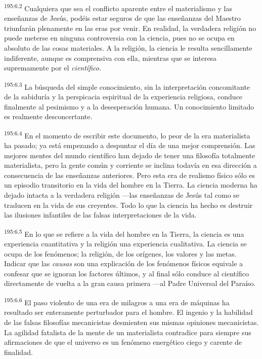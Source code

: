 \par 
\textsuperscript{195:6.2} Cualquiera que sea el conflicto aparente entre el materialismo y las enseñanzas de Jesús, podéis estar seguros de que las enseñanzas del Maestro triunfarán plenamente en las eras por venir. En realidad, la verdadera religión no puede meterse en ninguna controversia con la ciencia, pues no se ocupa en absoluto de las cosas materiales. A la religión, la ciencia le resulta sencillamente indiferente, aunque es comprensiva con ella, mientras que se interesa supremamente por el \textit{científico}.

\par 
\textsuperscript{195:6.3} La búsqueda del simple conocimiento, sin la interpretación concomitante de la sabiduría y la perspicacia espiritual de la experiencia religiosa, conduce finalmente al pesimismo y a la desesperación humana. Un conocimiento limitado es realmente desconcertante.

\par 
\textsuperscript{195:6.4} En el momento de escribir este documento, lo peor de la era materialista ha pasado; ya está empezando a despuntar el día de una mejor comprensión. Las mejores mentes del mundo científico han dejado de tener una filosofía totalmente materialista, pero la gente común y corriente se inclina todavía en esa dirección a consecuencia de las enseñanzas anteriores. Pero esta era de realismo físico sólo es un episodio transitorio en la vida del hombre en la Tierra. La ciencia moderna ha dejado intacta a la verdadera religión ---las enseñanzas de Jesús tal como se traducen en la vida de sus creyentes. Todo lo que la ciencia ha hecho es destruir las ilusiones infantiles de las falsas interpretaciones de la vida.

\par 
\textsuperscript{195:6.5} En lo que se refiere a la vida del hombre en la Tierra, la ciencia es una experiencia cuantitativa y la religión una experiencia cualitativa. La ciencia se ocupa de los fenómenos; la religión, de los orígenes, los valores y las metas. Indicar que las \textit{causas} son una explicación de los fenómenos físicos equivale a confesar que se ignoran los factores últimos, y al final sólo conduce al científico directamente de vuelta a la gran causa primera ---al Padre Universal del Paraíso.

\par 
\textsuperscript{195:6.6} El paso violento de una era de milagros a una era de máquinas ha resultado ser enteramente perturbador para el hombre. El ingenio y la habilidad de las falsas filosofías mecanicistas desmienten sus mismas opiniones mecanicistas. La agilidad fatalista de la mente de un materialista contradice para siempre sus afirmaciones de que el universo es un fenómeno energético ciego y carente de finalidad.

